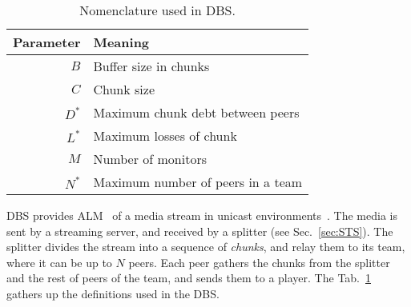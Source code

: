 
\label{sec:DBS}

\begin{table}
  \begin{tabular}{rl}
    Parameter & Meaning \\
    \hline
    $B$    & Buffer size in chunks \\
    $C$    & Chunk size \\
    $D^*$  & Maximum chunk debt between peers \\
    $L^*$  & Maximum losses of chunk \\
    $M$    & Number of monitors \\
    $N^*$  & Maximum number of peers in a team
  \end{tabular}
  \caption{Nomenclature used in DBS.\label{tab:DBS_nomenclature}}
\end{table}

DBS provides ALM~\cite{banerjee2002scalable} of a media stream in
unicast environments~\cite{comer2003computer}. The media is sent by a
streaming server,
and received by a splitter (see Sec.~\ref{sec:STS}). The splitter
divides the stream into a sequence of \emph{chunks}, and relay them to
its team, where it can be up to $N$ peers. Each peer gathers the
chunks from the splitter and the rest of peers of the team, and sends
them to a player. The Tab.~\ref{tab:DBS_nomenclature} gathers up the
definitions used in the DBS.
\begin{comment}
In single layered streams\footnote{Each layer of a
  scalable stream is received by a different peer attached to the same
  player capable or render scalable media.}, each peer is spawned by a
player (normal users should not run peers directly).
\end{comment}

\begin{comment}
/* quitar: We define the set of teams as
$\{T\}$,
and enumerate the peers in the team $T$ as $T=\{P_1,\cdots,P_{|T|}\}$. */
\end{comment}
